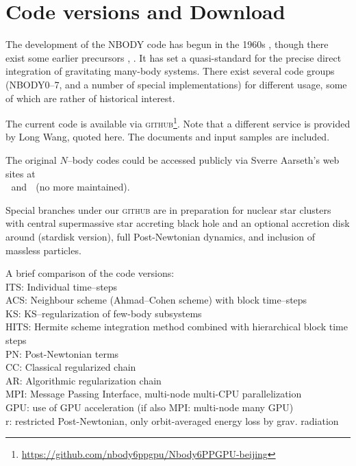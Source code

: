 
\section{Code versions and Download}
\label{ch:versions}

The development of the NBODY code has begun in the 1960s
\cite{a_63}, though there exist some earlier precursors
\cite{vH_60}, \cite{vH_63}.
It has set a quasi-standard for the precise direct integration
of gravitating many-body systems.
There exist several code groups (NBODY0--7, and a number of
special implementations) for different usage, some of which
are rather of historical interest.

The current code is available via \textsc{ github}\footnote{\url{https://github.com/nbody6ppgpu/Nbody6PPGPU-beijing}}. Note that a different service is provided by Long Wang, quoted here\cite{Varrietal2018}.
The documents and input samples are included.

The original $N$--body codes could be accessed publicly
via Sverre Aarseth's web sites at\\
\sout{} $\;$ and  $\;$
\sout{} (no more maintained).

Special branches under our \textsc{ github} are in preparation for nuclear star clusters with central supermassive star accreting black hole and an optional accretion disk around (stardisk version), full Post-Newtonian dynamics, and inclusion of massless particles.



\vspace{1cm}
\noindent
A brief comparison of the code versions:\\ [2ex]
%
ITS: Individual time--steps \\
ACS: Neighbour scheme (Ahmad--Cohen scheme) with block time--steps\\
KS: KS--regularization of few-body subsystems \\
HITS: Hermite scheme integration method combined with hierarchical
      block time steps\\
PN: Post-Newtonian terms\\
CC: Classical regularized chain \\
AR: Algorithmic regularization chain \\
MPI: Message Passing Interface, multi-node multi-CPU parallelization \\
GPU: use of GPU acceleration (if also MPI: multi-node many GPU) \\
r: restricted Post-Newtonian, only orbit-averaged energy loss by grav. radiation

